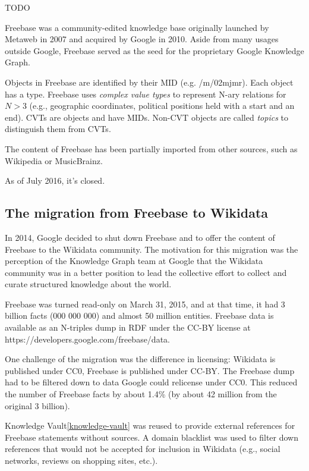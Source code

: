 TODO

Freebase was a community-edited knowledge base originally launched by Metaweb in
2007 and acquired by Google in 2010. Aside from many usages outside Google,
Freebase served as the seed for the proprietary Google Knowledge
Graph\cite{kg-refinement-survey}.

Objects in Freebase are identified by their MID (e.g. /m/02mjmr). Each object
has a type.
Freebase uses \textit{complex value types} to represent N-ary relations for
$N>3$ (e.g., geographic coordinates, political positions held with a start and
an end). CVTs are objects and have MIDs. Non-CVT objects are called
\textit{topics} to distinguish them from CVTs.

The content of Freebase has been partially imported from other sources, such as
Wikipedia or MusicBrainz.

As of July 2016, it's closed.

\subsection{The migration from Freebase to Wikidata\cite{freebase-wikidata-migration}}

In 2014, Google decided to shut down Freebase and to offer the content
of Freebase to the Wikidata community.
The motivation for this migration was the perception of the Knowledge Graph team
at Google that the Wikidata community was in a better position to lead the
collective effort to collect and curate structured knowledge about the world.

Freebase was turned read-only on March 31, 2015, and at that time, it had 3
billion facts (000 000 000) and almost 50 million entities. Freebase data is
available as an N-triples dump in RDF under the CC-BY license at
https://developers.google.com/freebase/data.

One challenge of the migration was the difference in licensing: Wikidata is
published under CC0, Freebase is published under CC-BY. The Freebase dump had to
be filtered down to data Google could relicense under CC0. This reduced the
number of Freebase facts by about 1.4\% (by about 42 million from the original
3 billion).

Knowledge Vault\ref{knowledge-vault} was reused to provide external references
for Freebase statements without sources. A domain blacklist was used to filter
down references that would not be accepted for inclusion in Wikidata (e.g.,
social networks, reviews on shopping sites, etc.).

